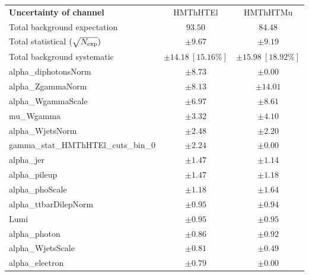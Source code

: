 
\begin{table}
\begin{center}
\setlength{\tabcolsep}{0.0pc}
\begin{tabular*}{\textwidth}{@{\extracolsep{\fill}}lcc}
\noalign{\smallskip}\hline\noalign{\smallskip}
{\bf Uncertainty of channel}                                    & HMThHTEl            & HMThHTMu            \\
\noalign{\smallskip}\hline\noalign{\smallskip}
Total background expectation             &  $93.50$        &  $84.48$       \\
\noalign{\smallskip}\hline\noalign{\smallskip}
Total statistical $(\sqrt{N_{\rm exp}})$              & $\pm 9.67$        & $\pm 9.19$       \\
Total background systematic               & $\pm 14.18\ [15.16\%] $        & $\pm 15.98\ [18.92\%] $             \\
\noalign{\smallskip}\hline\noalign{\smallskip}
\noalign{\smallskip}\hline\noalign{\smallskip}
alpha\_diphotonsNorm         & $\pm 8.73$          & $\pm 0.00$       \\
alpha\_ZgammaNorm         & $\pm 8.13$          & $\pm 14.01$       \\
alpha\_WgammaScale         & $\pm 6.97$          & $\pm 8.61$       \\
mu\_Wgamma         & $\pm 3.32$          & $\pm 4.10$       \\
alpha\_WjetsNorm         & $\pm 2.48$          & $\pm 2.20$       \\
gamma\_stat\_HMThHTEl\_cuts\_bin\_0         & $\pm 2.24$          & $\pm 0.00$       \\
alpha\_jer         & $\pm 1.47$          & $\pm 1.14$       \\
alpha\_pileup         & $\pm 1.47$          & $\pm 1.18$       \\
alpha\_phoScale         & $\pm 1.18$          & $\pm 1.64$       \\
alpha\_ttbarDilepNorm         & $\pm 0.95$          & $\pm 0.94$       \\
Lumi         & $\pm 0.95$          & $\pm 0.95$       \\
alpha\_photon         & $\pm 0.86$          & $\pm 0.92$       \\
alpha\_WjetsScale         & $\pm 0.81$          & $\pm 0.49$       \\
alpha\_electron         & $\pm 0.79$          & $\pm 0.00$       \\

\end{tabular*}
\end{center}
\end{table}
